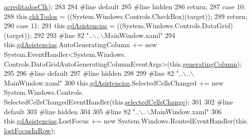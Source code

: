 \begin{DoxyCode}
      \hyperlink{class_asistencias__wpf_1_1_main_window_a5ef0449f967aa4a8f873a0be96d81e16}{acreditadosClk});
283             
284 \textcolor{preprocessor}{            #line default}
285 \textcolor{preprocessor}{}\textcolor{preprocessor}{            #line hidden}
286 \textcolor{preprocessor}{}            \textcolor{keywordflow}{return};
287             \textcolor{keywordflow}{case} 10:
288             this.\hyperlink{class_asistencias__wpf_1_1_main_window_adcd4add51c03081da4c3c0cc80125b45}{chkTodos} = ((System.Windows.Controls.CheckBox)(target));
289             \textcolor{keywordflow}{return};
290             \textcolor{keywordflow}{case} 11:
291             this.\hyperlink{class_asistencias__wpf_1_1_main_window_a813953ed3cd32fbaea64c551ae2728c9}{gdAsistencias} = ((System.Windows.Controls.DataGrid)(target));
292             
293 \textcolor{preprocessor}{            #line 82 "..\(\backslash\)..\(\backslash\)MainWindow.xaml"}
294 \textcolor{preprocessor}{}            this.\hyperlink{class_asistencias__wpf_1_1_main_window_a813953ed3cd32fbaea64c551ae2728c9}{gdAsistencias}.AutoGeneratingColumn += \textcolor{keyword}{new} System.EventHandler<System.Windows.
      Controls.DataGridAutoGeneratingColumnEventArgs>(this.\hyperlink{class_asistencias__wpf_1_1_main_window_a2a8d8e5780af57c07558431272ee4988}{generatingColumn});
295             
296 \textcolor{preprocessor}{            #line default}
297 \textcolor{preprocessor}{}\textcolor{preprocessor}{            #line hidden}
298 \textcolor{preprocessor}{}            
299 \textcolor{preprocessor}{            #line 82 "..\(\backslash\)..\(\backslash\)MainWindow.xaml"}
300 \textcolor{preprocessor}{}            this.\hyperlink{class_asistencias__wpf_1_1_main_window_a813953ed3cd32fbaea64c551ae2728c9}{gdAsistencias}.SelectedCellsChanged += \textcolor{keyword}{new} System.Windows.Controls.
      SelectedCellsChangedEventHandler(this.\hyperlink{class_asistencias__wpf_1_1_main_window_ae6a7656d280061fc7434874730ee8f34}{selectedCellsChange});
301             
302 \textcolor{preprocessor}{            #line default}
303 \textcolor{preprocessor}{}\textcolor{preprocessor}{            #line hidden}
304 \textcolor{preprocessor}{}            
305 \textcolor{preprocessor}{            #line 82 "..\(\backslash\)..\(\backslash\)MainWindow.xaml"}
306 \textcolor{preprocessor}{}            this.\hyperlink{class_asistencias__wpf_1_1_main_window_a813953ed3cd32fbaea64c551ae2728c9}{gdAsistencias}.LostFocus += \textcolor{keyword}{new} System.Windows.RoutedEventHandler(this.
      \hyperlink{class_asistencias__wpf_1_1_main_window_ae1c324b160c3fabd96c9a98b3b1dfa5e}{lostFocusInRow});

\end{DoxyCode}
